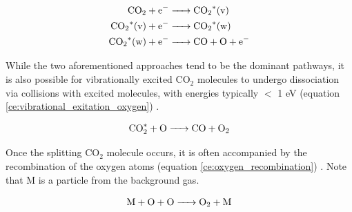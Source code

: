 \begin{equation}
\begin{aligned} 
    \ce{CO_2 + e^{-} & -> CO_2^*(v) \\ CO_2^*(v) + e^{-} & -> CO_2^*(w) \\ CO_2^*(w) + e^{-} & -> CO + O + e^{-}}
    \label{ce:step_wise_electron_dissociation}
\end{aligned} 
\end{equation}

While the two aforementioned approaches tend to be the dominant pathways, it is also possible for vibrationally excited CO$_2$ molecules to undergo dissociation via collisions with excited molecules, with energies typically $<$ 1 eV (equation \ref{ce:vibrational_exitation_oxygen}) \cite{Chen18} . 

\begin{equation}
    \ce{CO^*_2 + O -> CO + O_2}
    \label{ce:vibrational_exitation_oxygen}
\end{equation}


Once the splitting CO$_2$ molecule occurs, it is often accompanied by the recombination of the oxygen atoms (equation \ref{ce:oxygen_recombination}) \cite{Chen18}. Note that M is a particle from the background gas.

\begin{equation}
    \ce{M + O + O -> O_2 + M}
    \label{ce:oxygen_recombination}
\end{equation}

%
%
%
%
%
%
%
%


